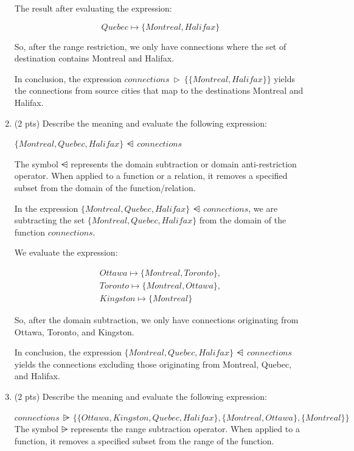 \documentclass[12pt]{article}
\begin{document}
\begin{spacing}{1.5}
\begin{enumerate}
		      The result after evaluating the expression:
		      
		      $$Quebec \mapsto \{Montreal, Halifax\}$$
		      
		      So, after the range restriction, we only have connections where the set of destination contains Montreal and Halifax.
		      
		      In conclusion, the expression $connections \: \triangleright \: \{\{Montreal, Halifax\}\}$ yields the connections from source cities that map to the destinations Montreal and Halifax.
		          
		\item (2 pts) Describe the meaning and evaluate the following expression:
		      
		      $\{Montreal, Quebec, Halifax\} \: \ndres \: connections$
		      
		      The symbol $\ndres$ represents the domain subtraction or domain anti-restriction operator. When applied to a function or a relation, it removes a specified subset from the domain of the function/relation.
		      
		      In the expression $\{Montreal, Quebec, Halifax\} \: \ndres \: connections$, we are subtracting the set  $\{Montreal, Quebec, Halifax\}$ from the domain of the function $connections$.
		      
		      We evaluate the expression:
		      
		      \begin{align*}
		      	Ottawa \mapsto \{Montreal, Toronto\}, \\
		      	Toronto \mapsto \{Montreal, Ottawa\}, \\
		      	Kingston \mapsto \{Montreal\}         
		      \end{align*}
		      
		      So, after the domain subtraction, we only have connections originating from Ottawa, Toronto, and Kingston.
		      
		      In conclusion, the expression $\{Montreal, Quebec, Halifax\} \: \ndres \: connections$ yields the connections excluding those originating from Montreal, Quebec, and Halifax.
		      
		\item (2 pts) Describe the meaning and evaluate the following expression:
		      
		      $connections \: \rsub \: \{\{Ottawa, Kingston, Quebec, Halifax\},\{Montreal, Ottawa\},\{Montreal\}\}$
		      \newline
		      The symbol $\rsub$ represents the range subtraction operator. When applied to a function, it removes a specified subset from the range of the function.
		      

\end{enumerate}
\end{spacing}
\end{document}
